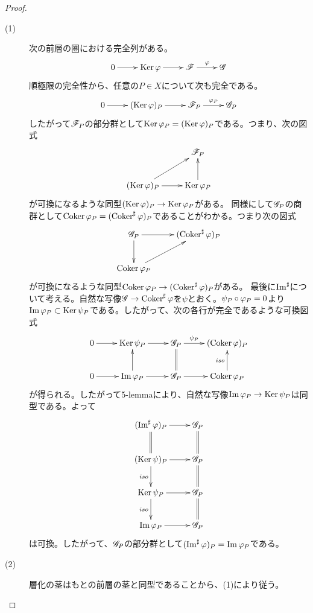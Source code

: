 \begin{proof} ${}$
  \begin{description}
    \item[(1)]
    次の前層の圏における完全列がある。
      \[
      \xymatrix{
      0 \ar[r] & \Ker \vp \ar[r] & \scrf \ar[r]^-{\vp} & \scrg
      }
      \]
      順極限の完全性から、任意の$P \in X$について次も完全である。
      \[
      \xymatrix{
      0 \ar[r] & (\Ker \vp)_P \ar[r]  & \scrf_P \ar[r]^-{\vp_P}  & \scrg_P
      }
      \]
      したがって$\mathscr{F}_P$の部分群として$\operatorname{Ker} {\varphi}_P = (\operatorname{Ker} {\varphi})_P$である。つまり、次の図式
    \[
    \xymatrix{
    {} & \scrf_P \\
    (\Ker \vp)_P \ar[ru] \ar[r]  & \Ker \vp_P \ar[u]
    }
    \]
    が可換になるような同型$(\operatorname{Ker} {\varphi} )_P \to \operatorname{Ker} {\varphi}_P$がある。
      同様にして$\mathscr{G}_P$の商群として$\operatorname{Coker} {\varphi}_P = (\operatorname{Coker}^{\sharp} {\varphi})_P$であることがわかる。つまり次の図式
\[
\xymatrix{
\scrg_P \ar[r] \ar[d] & (\Coker\sh \vp)_P \\
\Coker \vp_P \ar[ru]  &
}
\]
が可換になるような同型$\operatorname{Coker} {\varphi}_P \to (\operatorname{Coker}^{\sharp} {\varphi})_P$がある。
      最後に$\operatorname{Im}^{\sharp}$について考える。自然な写像$\mathscr{G} \to \operatorname{Coker}^{\sharp} {\varphi}$を$\psi$とおく。$\psi_P \circ {\varphi}_P = 0$より$\operatorname{Im} {\varphi}_P \subset \operatorname{Ker} \psi_P$である。したがって、次の各行が完全であるような可換図式
      \[
      \xymatrix{
0 \ar[r] & \Ker \psi_P \ar[r] & \scrg_P \ar[r]^-{\psi_P} \ar@{=}[d] & (\Coker \vp)_P \\
0 \ar[r] & \Im \vp_P \ar[u] \ar[r]  & \scrg_P \ar[r] & \Coker \vp_P \ar[u]^-{iso}
      }
      \]
      が得られる。したがって5-lemmaにより、自然な写像$\operatorname{Im} {\varphi}_P \to \operatorname{Ker} \psi_P$は同型である。よって
\[
\xymatrix{
(\Im\sh \vp)_P \ar[r]  \ar@{=}[d] & \scrg_P \ar@{=}[d] \\
(\Ker \psi)_P \ar[r]  \ar[d]_-{iso} & \scrg_P \ar@{=}[d] \\
\Ker \psi_P \ar[r]  \ar[d]_-{iso} & \scrg_P \ar@{=}[d] \\
\Im \vp_P \ar[r]   & \scrg_P
}
\]
  は可換。したがって、$\mathscr{G}_P$の部分群として$(\operatorname{Im}^{\sharp} {\varphi})_P = \operatorname{Im} {\varphi}_P$である。
      \item[(2)] 層化の茎はもとの前層の茎と同型であることから、(1)により従う。
  \end{description}
\end{proof}



